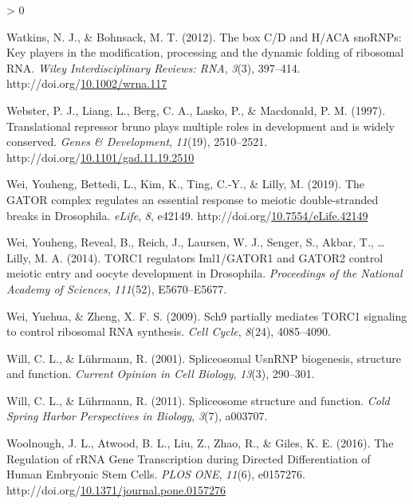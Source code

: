 \documentclass[12pt,oneside]{reedthesis}
\newlength{\cslhangindent}
\newenvironment{CSLReferences}[2] %
 {%
  \setlength{\parindent}{0pt}
  \ifodd #1 \everypar{\setlength{\hangindent}{\cslhangindent}}\ignorespaces\fi
  \ifnum #2 > 0
  \setlength{\parskip}{#2\baselineskip}
  \fi
 }%
 {}
\begin{document}
\begin{CSLReferences}{1}{0}
\leavevmode\hypertarget{ref-Watkins2012b}{}%
Watkins, N. J., \& Bohnsack, M. T. (2012). The box {C}/{D} and {H}/{ACA snoRNPs}: {Key} players in the modification, processing and the dynamic folding of ribosomal {RNA}. \emph{Wiley Interdisciplinary Reviews: RNA}, \emph{3}(3), 397--414. http://doi.org/\href{https://doi.org/10.1002/wrna.117}{10.1002/wrna.117}

\leavevmode\hypertarget{ref-Webster1997a}{}%
Webster, P. J., Liang, L., Berg, C. A., Lasko, P., \& Macdonald, P. M. (1997). Translational repressor bruno plays multiple roles in development and is widely conserved. \emph{Genes \& Development}, \emph{11}(19), 2510--2521. http://doi.org/\href{https://doi.org/10.1101/gad.11.19.2510}{10.1101/gad.11.19.2510}

\leavevmode\hypertarget{ref-Wei2018a}{}%
Wei, Youheng, Bettedi, L., Kim, K., Ting, C.-Y., \& Lilly, M. (2019). The {GATOR} complex regulates an essential response to meiotic double-stranded breaks in {Drosophila}. \emph{eLife}, \emph{8}, e42149. http://doi.org/\href{https://doi.org/10.7554/eLife.42149}{10.7554/eLife.42149}

\leavevmode\hypertarget{ref-Wei2014b}{}%
Wei, Youheng, Reveal, B., Reich, J., Laursen, W. J., Senger, S., Akbar, T., \ldots{} Lilly, M. A. (2014). {TORC1} regulators {Iml1}/{GATOR1} and {GATOR2} control meiotic entry and oocyte development in {Drosophila}. \emph{Proceedings of the National Academy of Sciences}, \emph{111}(52), E5670--E5677.

\leavevmode\hypertarget{ref-Wei2009a}{}%
Wei, Yuehua, \& Zheng, X. F. S. (2009). Sch9 partially mediates {TORC1} signaling to control ribosomal {RNA} synthesis. \emph{Cell Cycle}, \emph{8}(24), 4085--4090.

\leavevmode\hypertarget{ref-Will2001}{}%
Will, C. L., \& Lührmann, R. (2001). Spliceosomal {UsnRNP} biogenesis, structure and function. \emph{Current Opinion in Cell Biology}, \emph{13}(3), 290--301.

\leavevmode\hypertarget{ref-Will2011d}{}%
Will, C. L., \& Lührmann, R. (2011). Spliceosome structure and function. \emph{Cold Spring Harbor Perspectives in Biology}, \emph{3}(7), a003707.

\leavevmode\hypertarget{ref-woolnoughRegulationRRNAGene2016}{}%
Woolnough, J. L., Atwood, B. L., Liu, Z., Zhao, R., \& Giles, K. E. (2016). The {Regulation} of {rRNA Gene Transcription} during {Directed Differentiation} of {Human Embryonic Stem Cells}. \emph{PLOS ONE}, \emph{11}(6), e0157276. http://doi.org/\href{https://doi.org/10.1371/journal.pone.0157276}{10.1371/journal.pone.0157276}


\end{CSLReferences}
\end{document}
